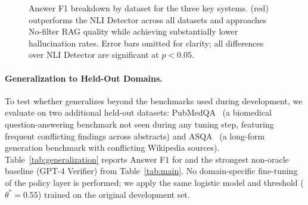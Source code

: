 \begin{figure}[t]
\centering
{}
\caption{Answer F1 breakdown by dataset for the three key systems. \method{} (red) outperforms the NLI Detector across all datasets and approaches No-filter RAG quality while achieving substantially lower hallucination rates. Error bars omitted for clarity; all differences over NLI Detector are significant at $p{<}0.05$.}
\label{fig:main-bar}
\end{figure}

\paragraph{Generalization to Held-Out Domains.}
To test whether \method{} generalizes beyond the benchmarks used during development, we evaluate on two additional held-out datasets: PubMedQA~\citep{pubmedqa2019} (a biomedical question-answering benchmark not seen during any tuning step, featuring frequent conflicting findings across abstracts) and ASQA~\citep{asqa2022} (a long-form generation benchmark with conflicting Wikipedia sources). Table~\ref{tab:generalization} reports Answer F1 for \method{} and the strongest non-oracle baseline (GPT-4 Verifier) from Table~\ref{tab:main}. No domain-specific fine-tuning of the policy layer is performed; we apply the same logistic model and threshold ($\theta^* = 0.55$) trained on the original development set.

